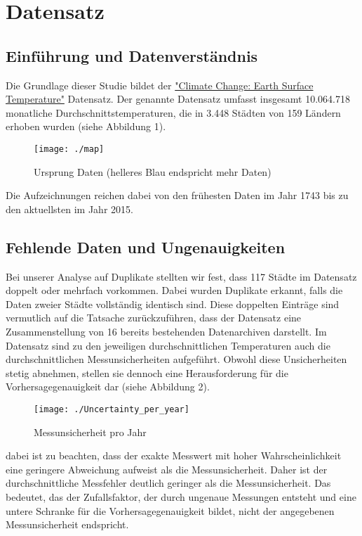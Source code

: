 \documentclass[acmtog, authorversion]{acmart} %
\begin{document}
\section{Datensatz}
\subsection{Einführung und Datenverständnis}
Die Grundlage dieser Studie bildet der \href{https://www.kaggle.com/datasets/berkeleyearth/climate-change-earth-surface-temperature-data?select=GlobalLandTemperaturesByCity.csv}{"Climate Change: Earth Surface Temperature"} Datensatz.
Der genannte Datensatz umfasst insgesamt 10.064.718 monatliche Durchschnittstemperaturen, die in 3.448 Städten von 159 Ländern erhoben wurden (siehe Abbildung 1).
\begin{figure}[H]
    \flushleft
    \texttt{[image: ./map]}
    \caption{Ursprung Daten (helleres Blau endspricht mehr Daten)}
    \label{fig:sub1}
\end{figure}

Die Aufzeichnungen reichen dabei von den frühesten Daten im Jahr 1743 bis zu den aktuellsten im Jahr 2015.

\subsection{Fehlende Daten und Ungenauigkeiten}
Bei unserer Analyse auf Duplikate stellten wir fest, dass 117 Städte im Datensatz doppelt oder mehrfach vorkommen. Dabei wurden Duplikate erkannt, falls die Daten zweier Städte vollständig identisch sind.  Diese doppelten Einträge sind vermutlich auf die Tatsache zurückzuführen, dass der Datensatz eine Zusammenstellung von 16 bereits bestehenden Datenarchiven darstellt. Im Datensatz sind zu den jeweiligen durchschnittlichen Temperaturen auch die durchschnittlichen Messunsicherheiten aufgeführt. Obwohl diese Unsicherheiten stetig abnehmen, stellen sie dennoch eine Herausforderung für die Vorhersagegenauigkeit dar (siehe Abbildung 2).
\begin{figure}[H]
    \flushleft
    \texttt{[image: ./Uncertainty\_per\_year]}
    \label{fig:sub2}
    \caption{Messunsicherheit pro Jahr}
\end{figure}
dabei ist zu beachten, dass der exakte Messwert mit hoher Wahrscheinlichkeit eine geringere Abweichung aufweist als die Messunsicherheit. Daher ist der durchschnittliche Messfehler deutlich geringer als die Messunsicherheit.
Das bedeutet, das der Zufallsfaktor, der durch ungenaue Messungen entsteht und eine untere Schranke für die Vorhersagegenauigkeit bildet, nicht der angegebenen Messunsicherheit endspricht.
\end{document}
